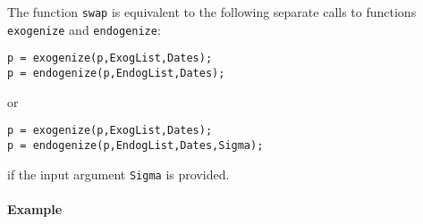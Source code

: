 The function \texttt{swap} is equivalent to the following separate calls
to functions \texttt{exogenize} and \texttt{endogenize}:

\begin{verbatim}
p = exogenize(p,ExogList,Dates);
p = endogenize(p,EndogList,Dates);
\end{verbatim}

or

\begin{verbatim}
p = exogenize(p,ExogList,Dates);
p = endogenize(p,EndogList,Dates,Sigma);
\end{verbatim}

if the input argument \texttt{Sigma} is provided.

\paragraph{Example}\label{example}


